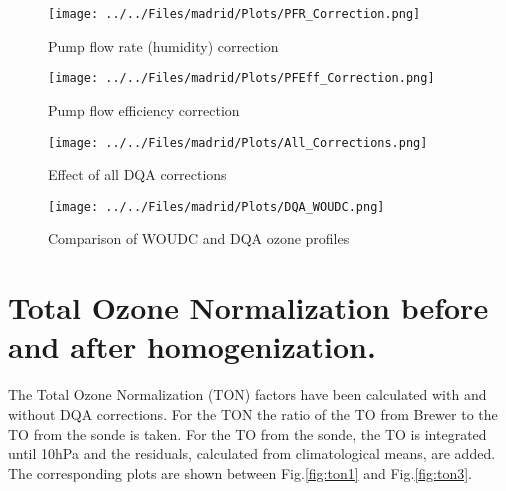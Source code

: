                                             \begin{figure}
        \centering
\texttt{[image: ../../Files/madrid/Plots/PFR\_Correction.png]}
    \caption{Pump flow rate (humidity) correction}
            \label{fig:op_pfr}
    \end{figure}

                                                \begin{figure}
        \centering
\texttt{[image: ../../Files/madrid/Plots/PFEff\_Correction.png]}
    \caption{Pump flow efficiency correction}
            \label{fig:op_pfe}
    \end{figure}


                                                \begin{figure}
        \centering
\texttt{[image: ../../Files/madrid/Plots/All\_Corrections.png]}
    \caption{Effect of all DQA corrections}
            \label{fig:op_all}
    \end{figure}


                                                \begin{figure}
        \centering
\texttt{[image: ../../Files/madrid/Plots/DQA\_WOUDC.png]}
    \caption{Comparison of WOUDC and DQA ozone profiles}
            \label{fig:op_dqawoudc}
    \end{figure}

\section{Total Ozone Normalization before and after homogenization.}

The Total Ozone Normalization (TON) factors have been calculated with and without DQA corrections. For the TON the ratio of the
TO from Brewer to the TO from the sonde is taken. For the TO from the sonde, the TO is integrated until 10hPa and the residuals, calculated from
climatological means, are added. The corresponding plots are shown between Fig.\ref{fig:ton1} and  Fig.\ref{fig:ton3}.


